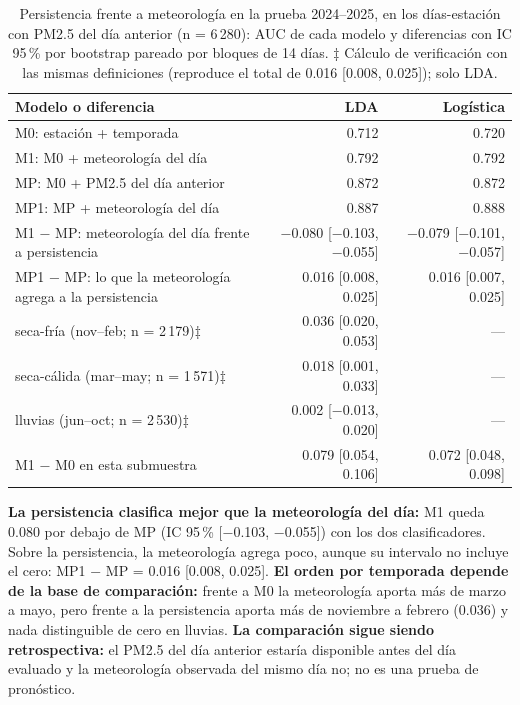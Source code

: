 \begin{table}[!htbp]
\centering\small
\caption{Persistencia frente a meteorología en la prueba 2024–2025, en los días-estación con PM2.5 del día anterior (n = 6\,280): AUC de cada modelo y diferencias con IC 95\,\% por bootstrap pareado por bloques de 14 días. ‡ Cálculo de verificación con las mismas definiciones (reproduce el total de 0.016 [0.008, 0.025]); solo LDA.}
\label{tbl:persistencia}
\begin{tabularx}{\textwidth}{Lrr}
\toprule
Modelo o diferencia & LDA & Logística\\
\midrule
M0: estación + temporada & 0.712 & 0.720\\
M1: M0 + meteorología del día & 0.792 & 0.792\\
MP: M0 + PM2.5 del día anterior & 0.872 & 0.872\\
MP1: MP + meteorología del día & 0.887 & 0.888\\
M1 − MP: meteorología del día frente a persistencia & −0.080 [−0.103, −0.055] & −0.079 [−0.101, −0.057]\\
MP1 − MP: lo que la meteorología agrega a la persistencia & 0.016 [0.008, 0.025] & 0.016 [0.007, 0.025]\\
\quad seca-fría (nov–feb; n = 2\,179)‡ & 0.036 [0.020, 0.053] & —\\
\quad seca-cálida (mar–may; n = 1\,571)‡ & 0.018 [0.001, 0.033] & —\\
\quad lluvias (jun–oct; n = 2\,530)‡ & 0.002 [−0.013, 0.020] & —\\
M1 − M0 en esta submuestra & 0.079 [0.054, 0.106] & 0.072 [0.048, 0.098]\\
\bottomrule
\end{tabularx}
\end{table}

\textbf{La persistencia clasifica mejor que la meteorología del día:} M1 queda 0.080 por debajo de MP (IC 95\,\% [−0.103, −0.055]) con los dos clasificadores. Sobre la persistencia, la meteorología agrega poco, aunque su intervalo no incluye el cero: MP1 − MP = 0.016 [0.008, 0.025]. \textbf{El orden por temporada depende de la base de comparación:} frente a M0 la meteorología aporta más de marzo a mayo, pero frente a la persistencia aporta más de noviembre a febrero (0.036) y nada distinguible de cero en lluvias. \textbf{La comparación sigue siendo retrospectiva:} el PM2.5 del día anterior estaría disponible antes del día evaluado y la meteorología observada del mismo día no; no es una prueba de pronóstico.

